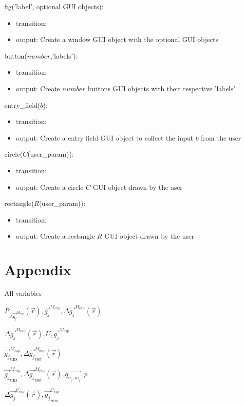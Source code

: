 \documentclass[12pt, titlepage]{article}
\begin{document}
\noindent fig('label', optional GUI objects):
\begin{itemize}
\item transition: 
\item output: Create a window GUI object with the optional GUI objects
\end{itemize}

\noindent button($number$,'labels'):
\begin{itemize}
\item transition:  
\item output: Create $number$ buttons GUI objects with their respective 'labels'
\end{itemize}

\noindent entry{\_}field($b$):
\begin{itemize}
\item transition:  
\item output: Create a entry field GUI object to collect the input $b$ from the user
\end{itemize}

\noindent circle($C$(user{\_}param)):
\begin{itemize}
\item transition:  
\item output: Create a circle $C$ GUI object drawn by the user 
\end{itemize}

\noindent rectangle($R$(user{\_}param)):
\begin{itemize}
\item transition:  
\item output: Create a rectangle $R$ GUI object drawn by the user 
\end{itemize}
\newpage




\newpage

\section{Appendix} \label{Appendix}


All variables

$P_{\Delta \overrightarrow{g_{j}}^{M_{\text{exp}}}}(\vec{r}), \overrightarrow{g_{j}}^{M_{\text{exp}}}, \Delta \overrightarrow{g_{j}}^{M_{\text{exp}}}(\vec{r})$

$\Delta \overrightarrow{g_{j}}^{M_{\text{exp}}}(\vec{r}),U,\overrightarrow{g_{j}}^{M_{\text{exp}}}$

$\overrightarrow{g_{j}}_{\text{uns}}^{M_{\text{exp}}}, \Delta\overrightarrow{g_{j}}_{\text{cor}}^{M_{\text{exp}}}(\vec{r})$

$\overrightarrow{g_{j}}_{\text{uns}}^{M_{\text{exp}}},\Delta\overrightarrow{g_{j}}_{\text{cor}}^{M_{\text{exp}}}(\vec{r}),\overrightarrow{q_{n_j,m_j}},p$

$\Delta \overrightarrow{g_{j}}^{C_{exp}}(\vec{r}),\overrightarrow{g_{j}}_{uns}^{C_{exp}}$
\end{document}
